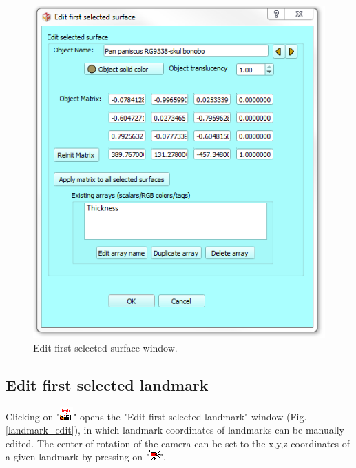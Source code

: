 \begin{figure}
  \centering
  \includegraphics[scale=0.55]{images/06/objects/edit_surface.png} 
	\caption{Edit first selected surface window.}
\label{actor_edit}
 
\end{figure}



\subsection{Edit first selected landmark}
Clicking on "\includegraphics[scale=0.7]{images/06/objects/landmark_edit.png}" opens the "Edit first selected landmark" window (Fig. \ref{landmark_edit}), in which landmark coordinates of landmarks can be manually edited. The center of rotation of the camera can be set to the x,y,z coordinates of a given landmark by pressing on "\includegraphics[scale=0.7]{images/06/objects/move_cam3.png}".




